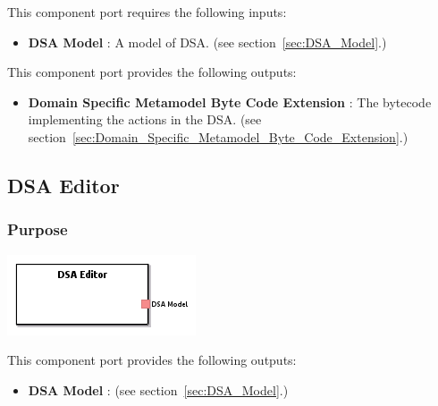\documentclass{gemoc} %
\begin{document}
This component port requires the following inputs:
\begin{itemize}
  \item \textbf{DSA Model} :
A model of DSA.
(see section~\ref{sec:DSA_Model}.)
\end{itemize}

This component port provides the following outputs:
\begin{itemize}
  \item \textbf{Domain Specific Metamodel Byte Code Extension} :
The bytecode implementing the actions in the DSA.
(see section~\ref{sec:Domain_Specific_Metamodel_Byte_Code_Extension}.)
\end{itemize}


\subsection{DSA Editor}
\label{sec:DSA_Editor}


\subsubsection{Purpose}


\begin{center}
\includegraphics*[trim=0.0cm 0.0cm 0cm 0.0cm, clip=true]{../images/generated/Generated_DSA_Editor.png}
\end{center}


This component port provides the following outputs:
\begin{itemize}
  \item \textbf{DSA Model} :
(see section~\ref{sec:DSA_Model}.)
\end{itemize}
\end{document}
